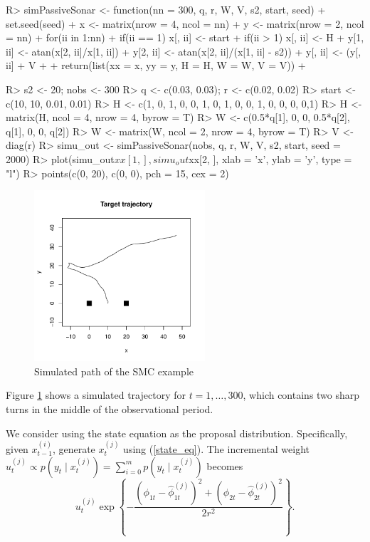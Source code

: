 \begin{example}
R> simPassiveSonar <- function(nn = 300, q, r, W, V, s2, start, seed){
+    set.seed(seed)
+    x <- matrix(nrow = 4, ncol = nn)
+    y <- matrix(nrow = 2, ncol = nn)
+    for(ii in 1:nn){    
+      if(ii == 1) x[, ii] <- start
+      if(ii > 1) x[, ii] <- H%
+      y[1, ii] <- atan(x[2, ii]/x[1, ii])
+      y[2, ii] <- atan(x[2, ii]/(x[1, ii] - s2))
+      y[, ii] <- (y[, ii] + V%
+    }
+    return(list(xx = x, yy = y, H = H, W = W, V = V))
+  }

R> s2 <- 20; nobs <- 300  
R> q <- c(0.03, 0.03); r <- c(0.02, 0.02)
R> start <- c(10, 10, 0.01, 0.01)
R> H <- c(1, 0, 1, 0, 0, 1, 0, 1, 0, 0, 1, 0, 0, 0,  0,1)
R> H <- matrix(H, ncol = 4, nrow = 4, byrow = T)
R> W <- c(0.5*q[1], 0, 0, 0.5*q[2], q[1], 0, 0, q[2])
R> W <- matrix(W, ncol = 2, nrow = 4, byrow = T)
R> V <- diag(r)
R> simu_out <- simPassiveSonar(nobs, q, r, W, V, s2, start, seed = 2000)
R> plot(simu_out$xx[1, ], simu_out$xx[2, ], xlab = 'x', ylab = 'y', type = "l")
R> points(c(0, 20), c(0, 0), pch = 15, cex = 2)
\end{example}
\begin{figure}\label{SMC1}
\centering
\includegraphics[width=2.5in]{SMC1.pdf}
\caption{Simulated path of the SMC example}
\label{fig:SMC}
\end{figure}


Figure \ref{fig:SMC} shows a simulated trajectory for $t=1,\ldots, 300$, which contains two sharp turns in the middle of the observational period. 


We consider using the state equation as the proposal distribution. Specifically, given $x_{t-1}^{(i)}$, generate $x_t^{(j)}$ using (\ref{state_eq}). The incremental weight $u_t^{(j)} \propto p(y_t \mid x_t^{(j)})=\sum_{i=0}^m p(y_t \mid x_t^{(j)})$ becomes
\[
u_t^{(j)} \exp \left\{- \frac{(\phi_{1t}-\hat{\phi}_{1t}^{(j)})^2 +(\phi_{2t}-\hat{\phi}_{2t}^{(j)})^2}{2 r^2} \right\}.
\]

